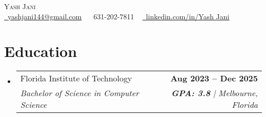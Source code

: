 \documentclass[letterpaper,11pt]{article}
\makeatletter
\newcommand{\resumeSubheading}[4]{
  \vspace{-2pt}\item
    \begin{tabular*}{1.0\textwidth}[t]{l@{\extracolsep{\fill}}r}
      \small#1 & \textbf{\small #2} \\
      \textit{\small#3} & \textit{\small #4} \\
    \end{tabular*}\vspace{-9pt}
}
\newcommand{\resumeSubHeadingListStart}{\begin{itemize}[leftmargin=0.0in, label={}]}
\newcommand{\resumeSubHeadingListEnd}{\end{itemize}}
\makeatother
\begin{document}

\begin{center}
    {\Huge \scshape Yash Jani} \\ \vspace{1pt}
    \small \href{mailto:yashjani144@gmail.com}{\raisebox{-0.2\height}\faEnvelope\  \underline{yashjani144@gmail.com}} ~ 
    \raisebox{-0.1\height}\faPhone\ 631-202-7811 ~
    \href{https://www.linkedin.com/in/yash-jani-8245bb26a/}{\raisebox{-0.2\height}\faLinkedin\ \underline{linkedin.com/in/Yash Jani}}  ~
    \vspace{-10pt}
\end{center}


\section{Education}
  \resumeSubHeadingListStart
    \resumeSubheading      
      {Florida Institute of Technology}{Aug 2023 -- Dec 2025}
      {Bachelor of Science in Computer Science}{\textbf{GPA: 3.8} | Melbourne, Florida}
  \resumeSubHeadingListEnd
  \vspace{-8pt}
  
\end{document}

